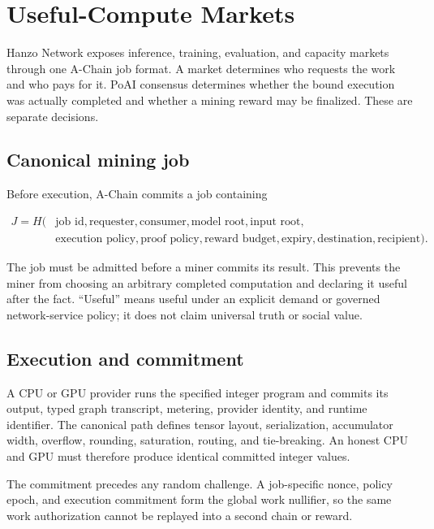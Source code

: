 \section{Useful-Compute Markets}
\label{sec:markets}

Hanzo Network exposes inference, training, evaluation, and capacity markets
through one A-Chain job format. A market determines who requests the work and
who pays for it. PoAI consensus determines whether the bound execution was
actually completed and whether a mining reward may be finalized. These are
separate decisions.

\subsection{Canonical mining job}

Before execution, A-Chain commits a job containing

\begin{equation}
\begin{split}
J=H(&\text{job id},\text{requester},\text{consumer},\text{model root},
\text{input root},\\
&\text{execution policy},\text{proof policy},\text{reward budget},
\text{expiry},\text{destination},\text{recipient}).
\end{split}
\end{equation}

The job must be admitted before a miner commits its result. This prevents the
miner from choosing an arbitrary completed computation and declaring it useful
after the fact. ``Useful'' means useful under an explicit demand or governed
network-service policy; it does not claim universal truth or social value.

\subsection{Execution and commitment}

A CPU or GPU provider runs the specified integer program and commits its output,
typed graph transcript, metering, provider identity, and runtime identifier. The
canonical path defines tensor layout, serialization, accumulator width,
overflow, rounding, saturation, routing, and tie-breaking. An honest CPU and GPU
must therefore produce identical committed integer values.

The commitment precedes any random challenge. A job-specific nonce, policy
epoch, and execution commitment form the global work nullifier, so the same work
authorization cannot be replayed into a second chain or reward.

